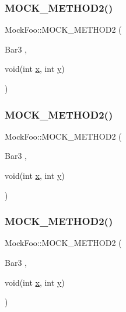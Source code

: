 \subsubsection{\texorpdfstring{MOCK\_METHOD2()}{MOCK\_METHOD2()}\hspace{0.1cm}{\footnotesize\ttfamily [4/6]}}
{\footnotesize\ttfamily Mock\+Foo\+::\+M\+O\+C\+K\+\_\+\+M\+E\+T\+H\+O\+D2 (\begin{DoxyParamCaption}\item[{Bar3}]{,  }\item[{void(int \mbox{\hyperlink{_obj__test_2lib_2googletest-master_2googlemock_2test_2gmock-matchers__test_8cc_a6150e0515f7202e2fb518f7206ed97dc}{x}}, int \mbox{\hyperlink{_obj__test_2lib_2googletest-master_2googlemock_2test_2gmock-matchers__test_8cc_a39cb44155237f0205e0feb931d5acbed}{y}})}]{ }\end{DoxyParamCaption})}

\mbox{\label{class_mock_foo_af1e0c374cadacdaa7ca69f9c38d85543}} 
\subsubsection{\texorpdfstring{MOCK\_METHOD2()}{MOCK\_METHOD2()}\hspace{0.1cm}{\footnotesize\ttfamily [5/6]}}
{\footnotesize\ttfamily Mock\+Foo\+::\+M\+O\+C\+K\+\_\+\+M\+E\+T\+H\+O\+D2 (\begin{DoxyParamCaption}\item[{Bar3}]{,  }\item[{void(int \mbox{\hyperlink{_obj__test_2lib_2googletest-master_2googlemock_2test_2gmock-matchers__test_8cc_a6150e0515f7202e2fb518f7206ed97dc}{x}}, int \mbox{\hyperlink{_obj__test_2lib_2googletest-master_2googlemock_2test_2gmock-matchers__test_8cc_a39cb44155237f0205e0feb931d5acbed}{y}})}]{ }\end{DoxyParamCaption})}

\mbox{\label{class_mock_foo_af1e0c374cadacdaa7ca69f9c38d85543}} 
\subsubsection{\texorpdfstring{MOCK\_METHOD2()}{MOCK\_METHOD2()}\hspace{0.1cm}{\footnotesize\ttfamily [6/6]}}
{\footnotesize\ttfamily Mock\+Foo\+::\+M\+O\+C\+K\+\_\+\+M\+E\+T\+H\+O\+D2 (\begin{DoxyParamCaption}\item[{Bar3}]{,  }\item[{void(int \mbox{\hyperlink{_obj__test_2lib_2googletest-master_2googlemock_2test_2gmock-matchers__test_8cc_a6150e0515f7202e2fb518f7206ed97dc}{x}}, int \mbox{\hyperlink{_obj__test_2lib_2googletest-master_2googlemock_2test_2gmock-matchers__test_8cc_a39cb44155237f0205e0feb931d5acbed}{y}})}]{ }\end{DoxyParamCaption})}

